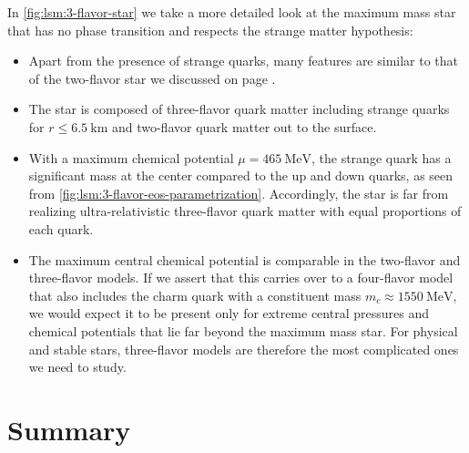 In \cref{fig:lsm:3-flavor-star} we take a more detailed look at the maximum mass star that has no phase transition and respects the strange matter hypothesis:
\begin{itemize}
\item Apart from the presence of strange quarks, many features are similar to that of the two-flavor star we discussed on page \pageref{list:lsm:2-flavor-star-discussion}.
\item The star is composed of three-flavor quark matter including strange quarks for $r \leq \SI{6.5}{\kilo\meter}$ and two-flavor quark matter out to the surface.
\item With a maximum chemical potential $\mu=\SI{465}{\mega\electronvolt}$, the strange quark has a significant mass at the center compared to the up and down quarks, as seen from \cref{fig:lsm:3-flavor-eos-parametrization}.
      Accordingly, the star is far from realizing ultra-relativistic three-flavor quark matter with equal proportions of each quark.
\item The maximum central chemical potential is comparable in the two-flavor and three-flavor models.
      If we assert that this carries over to a four-flavor model that also includes the charm quark with a constituent mass $m_c \approx \SI{1550}{\mega\electronvolt}$,
      we would expect it to be present only for extreme central pressures and chemical potentials that lie far beyond the maximum mass star.
      For physical and stable stars, three-flavor models are therefore the most complicated ones we need to study.
\end{itemize}

\section{Summary}

